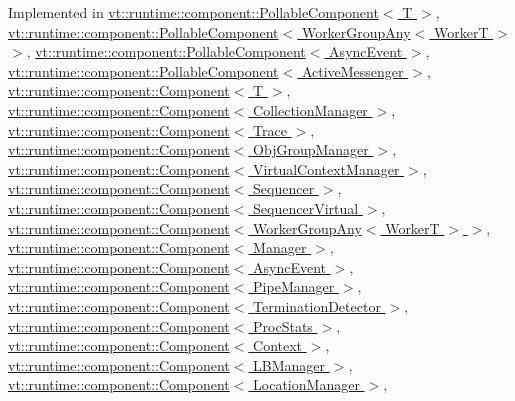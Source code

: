 Implemented in \hyperlink{structvt_1_1runtime_1_1component_1_1_pollable_component_a8ad6cfbc184ed9862cae5304605fe025}{vt\+::runtime\+::component\+::\+Pollable\+Component$<$ T $>$}, \hyperlink{structvt_1_1runtime_1_1component_1_1_pollable_component_a8ad6cfbc184ed9862cae5304605fe025}{vt\+::runtime\+::component\+::\+Pollable\+Component$<$ Worker\+Group\+Any$<$ Worker\+T $>$ $>$}, \hyperlink{structvt_1_1runtime_1_1component_1_1_pollable_component_a8ad6cfbc184ed9862cae5304605fe025}{vt\+::runtime\+::component\+::\+Pollable\+Component$<$ Async\+Event $>$}, \hyperlink{structvt_1_1runtime_1_1component_1_1_pollable_component_a8ad6cfbc184ed9862cae5304605fe025}{vt\+::runtime\+::component\+::\+Pollable\+Component$<$ Active\+Messenger $>$}, \hyperlink{structvt_1_1runtime_1_1component_1_1_component_a5a15bd0369a9d3765a6c70249bada96f}{vt\+::runtime\+::component\+::\+Component$<$ T $>$}, \hyperlink{structvt_1_1runtime_1_1component_1_1_component_a5a15bd0369a9d3765a6c70249bada96f}{vt\+::runtime\+::component\+::\+Component$<$ Collection\+Manager $>$}, \hyperlink{structvt_1_1runtime_1_1component_1_1_component_a5a15bd0369a9d3765a6c70249bada96f}{vt\+::runtime\+::component\+::\+Component$<$ Trace $>$}, \hyperlink{structvt_1_1runtime_1_1component_1_1_component_a5a15bd0369a9d3765a6c70249bada96f}{vt\+::runtime\+::component\+::\+Component$<$ Obj\+Group\+Manager $>$}, \hyperlink{structvt_1_1runtime_1_1component_1_1_component_a5a15bd0369a9d3765a6c70249bada96f}{vt\+::runtime\+::component\+::\+Component$<$ Virtual\+Context\+Manager $>$}, \hyperlink{structvt_1_1runtime_1_1component_1_1_component_a5a15bd0369a9d3765a6c70249bada96f}{vt\+::runtime\+::component\+::\+Component$<$ Sequencer $>$}, \hyperlink{structvt_1_1runtime_1_1component_1_1_component_a5a15bd0369a9d3765a6c70249bada96f}{vt\+::runtime\+::component\+::\+Component$<$ Sequencer\+Virtual $>$}, \hyperlink{structvt_1_1runtime_1_1component_1_1_component_a5a15bd0369a9d3765a6c70249bada96f}{vt\+::runtime\+::component\+::\+Component$<$ Worker\+Group\+Any$<$ Worker\+T $>$ $>$}, \hyperlink{structvt_1_1runtime_1_1component_1_1_component_a5a15bd0369a9d3765a6c70249bada96f}{vt\+::runtime\+::component\+::\+Component$<$ Manager $>$}, \hyperlink{structvt_1_1runtime_1_1component_1_1_component_a5a15bd0369a9d3765a6c70249bada96f}{vt\+::runtime\+::component\+::\+Component$<$ Async\+Event $>$}, \hyperlink{structvt_1_1runtime_1_1component_1_1_component_a5a15bd0369a9d3765a6c70249bada96f}{vt\+::runtime\+::component\+::\+Component$<$ Pipe\+Manager $>$}, \hyperlink{structvt_1_1runtime_1_1component_1_1_component_a5a15bd0369a9d3765a6c70249bada96f}{vt\+::runtime\+::component\+::\+Component$<$ Termination\+Detector $>$}, \hyperlink{structvt_1_1runtime_1_1component_1_1_component_a5a15bd0369a9d3765a6c70249bada96f}{vt\+::runtime\+::component\+::\+Component$<$ Proc\+Stats $>$}, \hyperlink{structvt_1_1runtime_1_1component_1_1_component_a5a15bd0369a9d3765a6c70249bada96f}{vt\+::runtime\+::component\+::\+Component$<$ Context $>$}, \hyperlink{structvt_1_1runtime_1_1component_1_1_component_a5a15bd0369a9d3765a6c70249bada96f}{vt\+::runtime\+::component\+::\+Component$<$ L\+B\+Manager $>$}, \hyperlink{structvt_1_1runtime_1_1component_1_1_component_a5a15bd0369a9d3765a6c70249bada96f}{vt\+::runtime\+::component\+::\+Component$<$ Location\+Manager $>$}, 